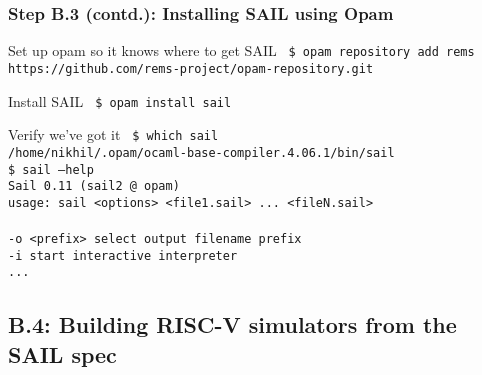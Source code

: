 \documentclass[aspectratio=169]{beamer}
\newcommand{\hm}{\hspace*{1em}}
\newcommand{\scripttt}{\scriptsize\tt}
\begin{document}
\begin{frame}
  \frametitle{Step B.3 (contd.): Installing SAIL using Opam}

  \begin{block}{Set up opam so it knows where to get SAIL}
    {\scripttt
      \hm{}\$ opam repository add rems https://github.com/rems-project/opam-repository.git
    }
  \end{block}

  \begin{block}{Install SAIL}
    {\scripttt
      \hm{}\$ opam install sail \\
    }
  \end{block}

  \begin{block}{Verify we've got it}
    {\scripttt
      \hm{}\$ which sail \\
      \hm{}/home/nikhil/.opam/ocaml-base-compiler.4.06.1/bin/sail \\
      \hm{}\$ sail --help \\
      \hm{}Sail 0.11 (sail2 @ opam) \\
      \hm{}usage: sail <options> <file1.sail> ... <fileN.sail> \\
      \hm{} \\
      \hm{}  -o <prefix>                              select output filename prefix \\
      \hm{}  -i                                       start interactive interpreter \\
      \hm{}  ...
    }
  \end{block}

\end{frame}


\subsection{B.4: Building RISC-V simulators from the SAIL spec}

\end{document}
